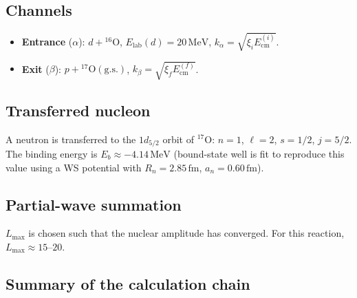 \documentclass[12pt,a4paper]{article}
\newcommand{\fm}{\,\mathrm{fm}}
\newcommand{\MeV}{\,\mathrm{MeV}}
\begin{document}
\subsection{Channels}

\begin{itemize}
  \item \textbf{Entrance} ($\alpha$): $d + {}^{16}\mathrm{O}$,
        $E_\mathrm{lab}(d) = 20\MeV$, $k_\alpha = \sqrt{\xi_i E_\mathrm{cm}^{(i)}}$.
  \item \textbf{Exit} ($\beta$): $p + {}^{17}\mathrm{O}(\mathrm{g.s.})$,
        $k_\beta = \sqrt{\xi_f E_\mathrm{cm}^{(f)}}$.
\end{itemize}

\subsection{Transferred nucleon}

A neutron is transferred to the $1d_{5/2}$ orbit of ${}^{17}\mathrm{O}$:
$n = 1$, $\ell = 2$, $s = 1/2$, $j = 5/2$.
The binding energy is $E_b \approx -4.14\MeV$ (bound-state well is fit
to reproduce this value using a WS potential with
$R_n = 2.85\fm$, $a_n = 0.60\fm$).

\subsection{Partial-wave summation}

$L_\mathrm{max}$ is chosen such that the nuclear amplitude has
converged.  For this reaction, $L_\mathrm{max} \approx 15$--$20$.

\subsection{Summary of the calculation chain}
\end{document}
